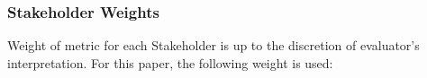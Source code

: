 \begin{frame}
	\frametitle{Stakeholder Weights}
	Weight of metric for each Stakeholder is up to the discretion of evaluator's interpretation.
	For this paper, the following weight is used:
	\begin{table}[h]
		\centering
		\caption {Metrics and Weight for Each Stakeholder}
		\label{tab:stakeholders_weight}
		\end{table}
	\end{frame}